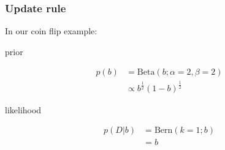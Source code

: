 \documentclass[t]{beamer}
\begin{document}
\begin{frame}
  \frametitle{Update rule}
  In our coin flip example:\\
  \begin{minipage}{0.1\paperwidth}
    prior
  \end{minipage}
  \hspace{0.05\paperwidth}
  \begin{minipage}{0.3\paperwidth}
    \begin{align*}
      p(b) &= \mathrm{Beta}(b; \alpha=2, \beta=2) \\
           &\propto b^{\frac{1}{2}} (1-b)^{\frac{1}{2}}
    \end{align*}
  \end{minipage}
  \begin{minipage}[t][][b]{0.3\paperwidth}
    \begin{adjustbox}{width=0.7\textwidth}
    \end{adjustbox}
  \end{minipage}

  \begin{minipage}{0.1\paperwidth}
    likelihood
  \end{minipage}
  \begin{minipage}{0.3\paperwidth}
    \begin{align*}
      p(D|b) &= \mathrm{Bern}(k=1; b) \\
             &= b
    \end{align*}
  \end{minipage}
  \begin{minipage}{0.3\paperwidth}
  \begin{adjustbox}{width=0.7\textwidth}
    \end{adjustbox}
  \end{minipage}
  

\end{frame}
\end{document}
